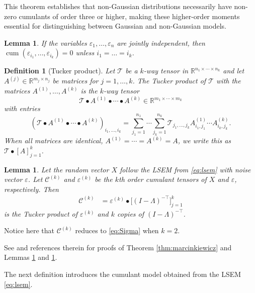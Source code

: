 \documentclass[11pt,a4paper]{article}
\numberwithin{equation}{section}
\newtheorem{definition}[theorem]{Definition}
\newtheorem{lemma}[theorem]{Lemma}
\DeclareMathOperator{\cum}{cum}
\begin{document}
This theorem establishes that non-Gaussian distributions necessarily have non-zero cumulants of order three or higher, making these higher-order moments essential for distinguishing between Gaussian and non-Gaussian models.


\begin{lemma}
\label{lem:indep_cum}
If the variables $ \varepsilon_1,\dots,\varepsilon_n$ are jointly independent, then $\cum(\varepsilon_{i_1},\dots,\varepsilon_{i_k})=0$ unless $i_1=\dots=i_k$.
\end{lemma}

\begin{definition}[Tucker product]
\label{def:tucker_product}
Let $\mathcal{T}$ be a $k$-way tensor in $\mathbb{R}^{n_1 \times \cdots \times n_k}$ and let $A^{(j)} \in \mathbb{R}^{m_j \times n_j}$ be matrices for $j = 1, \ldots, k$. The \emph{Tucker product} of $\mathcal{T}$ with the matrices $A^{(1)}, \ldots, A^{(k)}$ is the $k$-way tensor
\[
\mathcal{T} \bullet A^{(1)} \bullet \cdots \bullet A^{(k)} \in \mathbb{R}^{m_1 \times \cdots \times m_k}
\]
with entries
\[
\left(\mathcal{T} \bullet A^{(1)} \bullet \cdots \bullet A^{(k)}\right)_{i_1,\ldots,i_k} = \sum_{j_1=1}^{n_1} \cdots \sum_{j_k=1}^{n_k} \mathcal{T}_{j_1,\ldots,j_k} A^{(1)}_{i_1,j_1} \cdots A^{(k)}_{i_k,j_k}.
\]
When all matrices are identical, $A^{(1)} = \cdots = A^{(k)} = A$, we write this as $\mathcal{T} \bullet [A]_{j=1}^k$.
\end{definition}

\begin{lemma}
\label{lem:tucker}
Let the random vector $X$ follow the LSEM from \eqref{eq:lsem} with noise 
vector $\varepsilon$. Let $\mathcal{C}^{(k)}$ and $\varepsilon^{(k)}$ be the 
$k$th order cumulant tensors of $X$ and $\varepsilon$, respectively. Then
\begin{align*}
    \mathcal{C}^{(k)} &= \varepsilon^{(k)}\bullet 
    \bigl[(I-\Lambda)^{-\top}\bigr]_{j=1}^k
\end{align*}
is the Tucker product of $\varepsilon^{(k)}$ and $k$ copies of 
$(I-\Lambda)^{-\top}$.
\end{lemma}
Notice here that $\mathcal{C}^{(k)}$ reduces to \eqref{eq:Sigma} when $k=2$.

See \citet{comon:jutten:handbook} and references therein for proofs of Theorem \ref{thm:marcinkiewicz} and Lemmas \ref{lem:indep_cum} and \ref{lem:tucker}.

The next definition introduces the cumulant model obtained from the LSEM \eqref{eq:lsem}.  %
\end{document}
